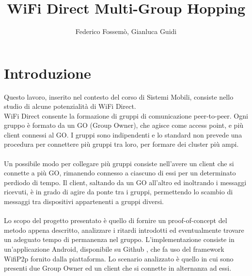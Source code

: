\documentclass{llncs}
\begin{document}
	\mainmatter              %
	\title{WiFi Direct Multi-Group Hopping}
	\author{Federico Fossemò, Gianluca Guidi}
	\maketitle
	

\section{Introduzione}
\paragraph{} Questo lavoro, inserito nel contesto del corso di Sistemi Mobili, consiste nello studio di alcune potenzialità di WiFi Direct.\\
WiFi Direct consente la formazione di gruppi di comunicazione peer-to-peer. Ogni gruppo è formato da un GO (Group Owner), che agisce come access point, e più client connessi al GO. I gruppi sono indipendenti e lo standard non prevede una procedura per connettere più gruppi tra loro, per formare dei cluster più ampi.

\paragraph{} Un possibile modo per collegare più gruppi consiste nell'avere un client che si connette a più GO, rimanendo connesso a ciascuno di essi per un determinato perdiodo di tempo. Il client, saltando da un GO all'altro ed inoltrando i messaggi ricevuti, è in grado di agire da ponte tra i gruppi, permettendo lo scambio di messaggi tra dispositivi appartenenti a gruppi diversi.

\paragraph{} Lo scopo del progetto presentato è quello di fornire un proof-of-concept del metodo appena descritto, analizzare i ritardi introdotti ed eventualmente trovare un adeguato tempo di permanenza nel gruppo. L'implementazione consiste in un'applicazione Android, disponibile su Github \cite{codice}, che fa uso del framework WifiP2p fornito dalla piattaforma. Lo scenario analizzato è quello in cui sono presenti due Group Owner ed un client che si connette in alternanza ad essi.
\end{document}
